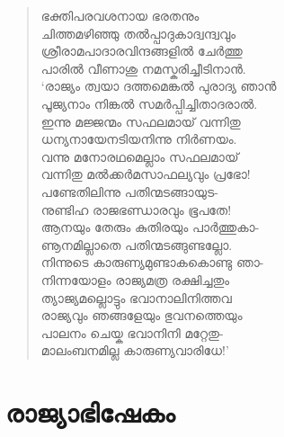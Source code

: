 \begin{verse}
ഭക്തിപരവശനായ ഭരതനും\\
ചിത്തമഴിഞ്ഞു തല്‍പ്പാദുകാദ്വന്ദ്വവും\\
ശ്രീരാമപാദാരവിന്ദങ്ങളില്‍ ചേര്‍ത്തു\\
പാരില്‍ വീണാശു നമസ്കരിച്ചീടിനാന്‍.\\
‘രാജ്യം ത്വയാ ദത്തമെങ്കല്‍ പുരാദ്യ ഞാന്‍\\
പൂജ്യനാം നിങ്കല്‍ സമര്‍പ്പിച്ചിതാദരാല്‍.\\
ഇന്നു മജ്ജന്മം സഫലമായ് വന്നിതു\\
ധന്യനായേനടിയനിന്നു നിര്‍ണയം.\\
വന്നു മനോരഥമെല്ലാം സഫലമായ്\\
വന്നിതു മല്‍ക്കര്‍മസാഫല്യവും പ്രഭോ!\\
പണ്ടേതിലിന്നു പതിന്മടങ്ങായുട-\\
നുണ്ടിഹ രാജഭണ്ഡാരവും ഭൂപതേ!\\
ആനയും തേരും കുതിരയും പാര്‍ത്തുകാ-\\
ണൂനമില്ലാതെ പതിന്മടങ്ങുണ്ടല്ലോ.\\
നിന്നുടെ കാരുണ്യമുണ്ടാകകൊണ്ടു ഞാ-\\
നിന്നയോളം രാജ്യമത്ര രക്ഷിച്ചതും\\
ത്യാജ്യമല്ലൊട്ടും ഭവാനാലിനിത്തവ\\
രാജ്യവും ഞങ്ങളേയും ഭുവനത്തെയും\\
പാലനം ചെയ്ക ഭവാനിനി മറ്റേതു-\\
മാലംബനമില്ല കാരുണ്യവാരിധേ!’
\end{verse}


\section{രാജ്യാഭിഷേകം}

